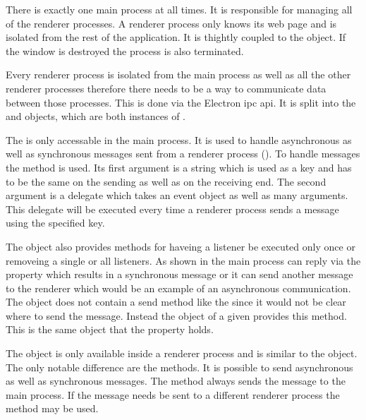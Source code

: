 
There is exactly one main process at all times. It is responsible for managing all of the renderer processes. A renderer process only knows its web page and is isolated from the rest of the application. It is thightly coupled to the  object. If the window is destroyed the process is also terminated.


Every renderer process is isolated from the main process as well as all the other renderer processes therefore there needs to be a way to communicate data between those processes. This is done via the Electron \gls{ipc} \gls{api}. It is split into the  and  objects, which are both instances of .


The  is only accessable in the main process. It is used to handle asynchronous as well as synchronous messages sent from a renderer process (). To handle messages the  method is used. Its first argument is a string which is used as a key and has to be the same on the sending as well as on the receiving end. The second argument is a delegate which takes an event object as well as many arguments. This delegate will be executed every time a renderer process sends a message using the specified key.

The  object also provides methods for haveing a listener be executed only once or removeing a single or all listeners. As shown in  the main process can reply via the  property which results in a synchronous message or it can send another message to the renderer which would be an example of an asynchronous communication. The  object does not contain a send method like the  since it would not be clear where to send the message. Instead the  object of a given  provides this method. This is the same object that the  property holds. \cite{ipcMain}

The  object is only available inside a renderer process and is similar to the  object. The only notable difference are the  methods. It is possible to send asynchronous as well as synchronous messages. The  method always sends the message to the main process. If the message needs be sent to a different renderer process the  method may be used. \cite{ipcRenderer}

